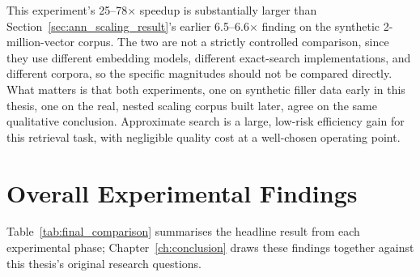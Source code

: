 \documentclass[a4paper,oneside,bibliography=totoc]{scrbook}
\begin{document}
This experiment's 25--78$\times$ speedup is substantially larger than Section~\ref{sec:ann_scaling_result}'s earlier 6.5--6.6$\times$ finding on the synthetic 2-million-vector corpus. The two are not a strictly controlled comparison, since they use different embedding models, different exact-search implementations, and different corpora, so the specific magnitudes should not be compared directly. What matters is that both experiments, one on synthetic filler data early in this thesis, one on the real, nested scaling corpus built later, agree on the same qualitative conclusion. Approximate search is a large, low-risk efficiency gain for this retrieval task, with negligible quality cost at a well-chosen operating point.

\section{Overall Experimental Findings}
\label{sec:overall_findings}

Table~\ref{tab:final_comparison} summarises the headline result from each experimental phase; Chapter~\ref{ch:conclusion} draws these findings together against this thesis's original research questions.
\end{document}
